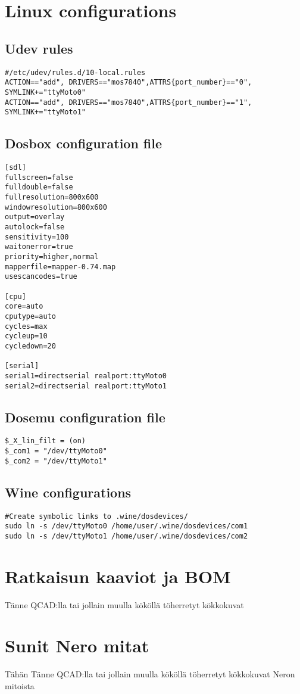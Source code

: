 \documentclass[11pt,a4paper,oneside,article]{memoir}
\begin{document}
\chapter{Linux configurations}\label{appx:first}

\section{Udev rules}
\begin{lstlisting}
#/etc/udev/rules.d/10-local.rules
ACTION=="add", DRIVERS=="mos7840",ATTRS{port_number}=="0", SYMLINK+="ttyMoto0"
ACTION=="add", DRIVERS=="mos7840",ATTRS{port_number}=="1", SYMLINK+="ttyMoto1"
\end{lstlisting}

\section{Dosbox configuration file}
\begin{lstlisting}
[sdl]
fullscreen=false
fulldouble=false
fullresolution=800x600
windowresolution=800x600
output=overlay
autolock=false
sensitivity=100
waitonerror=true
priority=higher,normal
mapperfile=mapper-0.74.map
usescancodes=true

[cpu]
core=auto
cputype=auto
cycles=max
cycleup=10
cycledown=20

[serial]
serial1=directserial realport:ttyMoto0
serial2=directserial realport:ttyMoto1
\end{lstlisting}

\section{Dosemu configuration file}
\begin{lstlisting}
$_X_lin_filt = (on)
$_com1 = "/dev/ttyMoto0"
$_com2 = "/dev/ttyMoto1"

\end{lstlisting}

\section{Wine configurations}
\begin{lstlisting}
#Create symbolic links to .wine/dosdevices/
sudo ln -s /dev/ttyMoto0 /home/user/.wine/dosdevices/com1
sudo ln -s /dev/ttyMoto1 /home/user/.wine/dosdevices/com2
\end{lstlisting}

\newpage
{}
\chapter{Ratkaisun kaaviot ja BOM}\label{appx:2}
Tänne QCAD:lla tai jollain muulla kököllä töherretyt kökkokuvat

\newpage
{}
\chapter{Sunit Nero mitat}\label{appx:nero}
Tähän Tänne QCAD:lla tai jollain muulla kököllä töherretyt kökkokuvat Neron mitoista
\end{document}
